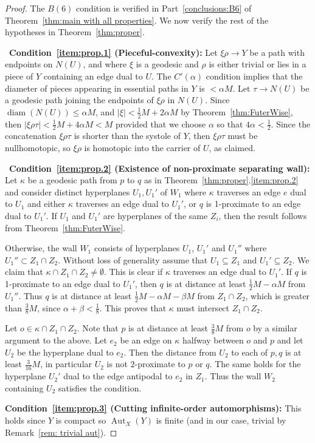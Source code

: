 \documentclass[12pt,oneside]{amsart}
\theoremstyle{definition}
\theoremstyle{definition}
\theoremstyle{remark}
\DeclareMathOperator{\diam}{\text{diam}}
\DeclareMathOperator{\Aut}{Aut}
\begin{document}
\begin{proof}
 The  $B(6)$ condition is verified in Part~\ref{conclusions:B6} of  Theorem~\ref{thm:main with all properties}. We now verify the rest of the hypotheses in Theorem~\ref{thm:proper}.
 
\
\textbf{Condition~\ref{item:prop.1} (Pieceful-convexity):} 
Let $\xi\rho \rightarrow Y$ be a path with endpoints on $N(U)$, and where $\xi$ is a geodesic and $\rho$ is either trivial or lies in a piece of
$Y$ containing an edge dual to $U$. The $C'(\alpha) $ condition implies that the diameter of pieces appearing in essential paths in $Y$ is  $< \alpha M$. Let $\tau \rightarrow N(U)$  be a geodesic path joining the endpoints of $\xi\rho$ in $N(U)$. Since $\diam (N(U))\leq \alpha M$, and $|\xi|< \frac{1}{2}M + 2\alpha M$ by Theorem~\ref{thm:FuterWise}, then $|\xi\rho\tau|< \frac 1 2 M+4\alpha M < M$ provided that we choose $\alpha$ so that $4\alpha <\frac 1 2$. Since the concatenation $\xi\rho\tau$ is shorter than the systole of $Y$, then $\xi\rho\tau$ must be nullhomotopic, so $\xi\rho$ is homotopic into the carrier of $U$, as claimed. 

\
\textbf{Condition~\ref{item:prop.2} (Existence of non-proximate separating wall):}
 Let $\kappa$ be a geodesic path from $p$ to $q$ as in  Theorem~\ref{thm:proper}.\eqref{item:prop.2} and  consider distinct hyperplanes $U_1, U_1'$ of $W_1$ where $\kappa$ traverses an edge $e$ dual to $U_1$ and either $\kappa$ traverses an edge dual to $U_1'$, or $q$ is 1-proximate to an edge dual to $U_1'$. If $U_1$ and $U_1'$ are hyperplanes of the same $Z_i$, then the result follows from Theorem~\ref{thm:FuterWise}.

 Otherwise, the wall $W_1$ consists of  hyperplanes $U_1$, $U_1'$ and $U_1''$ where $U_1'' \subset Z_1\cap Z_2$. Without loss of generality assume that $U_1\subseteq Z_1$ and $U_1'\subseteq Z_2$. We claim that  $\kappa \cap Z_1\cap Z_2 \neq \emptyset$.
 This is clear if $\kappa$ traverses an edge dual to $U_1'$. If $q$ is 1-proximate to an edge dual to $U_1'$, then $q$ is at distance at least $\frac{1}{2}M -\alpha M$ from $U_1''$. Thus $q$ is at distance at least $\frac{1}{2}M - \alpha M - \beta M$ from $Z_1\cap Z_2$, which is greater than $\frac {3}{8} M$, since $\alpha+\beta<\frac{1}{8}$. This proves that $\kappa$ must intersect $Z_1\cap Z_2$. 
 
 Let $o\in \kappa \cap Z_1\cap Z_2$.
 Note that $p$ is at distance at least $\frac 38 M$ from $o$ by a similar argument to the above. Let $e_2$ be an edge on $\kappa$ halfway between $o$ and $p$ and let $U_2$ be the hyperplane dual to $e_2$. Then the distance from $U_2$ to each of $p,q$ is at least $\frac 3{16} M$, in particular $U_2$ is not $2$-proximate to $p$ or $q$. The same holds for the hyperplane $U_2'$ dual to the edge antipodal to  $e_2$ in $Z_1$. Thus the wall $W_2$ containing $U_2$ satisfies the condition.%



\textbf{Condition~\ref{item:prop.3} (Cutting infinite-order automorphisms):} This holds  since  $Y$ is compact so $\Aut_X(Y)$ is finite (and in our case, trivial by Remark~\ref{rem: trivial aut}).
\end{proof}
\end{document}
